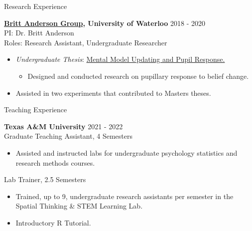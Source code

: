 \documentclass{resume} %
\begin{document}
\begin{rSection}{Research Experience}
\begin{itemize}[nosep]
    \end{itemize}
    
    {\bf \href{https://brittlab.uwaterloo.ca/}{Britt Anderson Group}, 
        University of Waterloo}
    \hfill {2018 - 2020}
    \\PI: Dr. Britt Anderson
    \\Roles: Research Assistant, Undergraduate Researcher
    
    \begin{itemize}[nosep]
        
        \item \emph{Undergraduate Thesis}: 
        \href{https://github.com/sjp117/Undergrad_Projects/tree/master/mentalModelUpdatingPupil}{Mental
         Model Updating and Pupil Response.}
            \begin{itemize}
                \item Designed and conducted research on pupillary response to 
                belief change.
            \end{itemize}
        \item Assisted in two experiments that contributed to Masters theses.
        
    \end{itemize}
    
\end{rSection}


\begin{rSection}{Teaching Experience}
    
    {\bf {Texas A\&M University}}
    \hfill {2021 - 2022}
    \\Graduate Teaching Assistant, 4 Semesters
    
    \begin{itemize}[nosep]
        
        \item Assisted and instructed labs for undergraduate psychology 
        statistics and research methods courses.
        
    \end{itemize}

    Lab Trainer, 2.5 Semesters
    
    \begin{itemize}[nosep]
        
        \item Trained, up to 9, undergraduate research assistants per 
        semester in the Spatial Thinking \& STEM Learning Lab.
        \item Introductory R Tutorial.
        
    \end{itemize}
    
\end{rSection}
\end{document}

